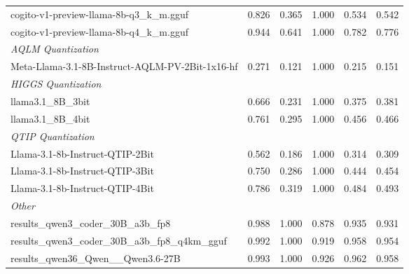 \begin{table}[htbp]
{\begin{tabular}{lrrrrr}
    cogito-v1-preview-llama-8b-q3\_k\_m.gguf & 0.826 & 0.365 & 1.000 & 0.534 & 0.542 \\
    cogito-v1-preview-llama-8b-q4\_k\_m.gguf & 0.944 & 0.641 & 1.000 & 0.782 & 0.776 \\
    \midrule
    \multicolumn{6}{l}{\textit{AQLM Quantization}} \\
    \midrule
    Meta-Llama-3.1-8B-Instruct-AQLM-PV-2Bit-1x16-hf & 0.271 & 0.121 & 1.000 & 0.215 & 0.151 \\
    \midrule
    \multicolumn{6}{l}{\textit{HIGGS Quantization}} \\
    \midrule
    llama3.1\_8B\_3bit & 0.666 & 0.231 & 1.000 & 0.375 & 0.381 \\
    llama3.1\_8B\_4bit & 0.761 & 0.295 & 1.000 & 0.456 & 0.466 \\
    \midrule
    \multicolumn{6}{l}{\textit{QTIP Quantization}} \\
    \midrule
    Llama-3.1-8b-Instruct-QTIP-2Bit & 0.562 & 0.186 & 1.000 & 0.314 & 0.309 \\
    Llama-3.1-8b-Instruct-QTIP-3Bit & 0.750 & 0.286 & 1.000 & 0.444 & 0.454 \\
    Llama-3.1-8b-Instruct-QTIP-4Bit & 0.786 & 0.319 & 1.000 & 0.484 & 0.493 \\
    \midrule
    \multicolumn{6}{l}{\textit{Other}} \\
    \midrule
    results\_qwen3\_coder\_30B\_a3b\_fp8 & 0.988 & 1.000 & 0.878 & 0.935 & 0.931 \\
    results\_qwen3\_coder\_30B\_a3b\_fp8\_q4km\_gguf & 0.992 & 1.000 & 0.919 & 0.958 & 0.954 \\
    results\_qwen36\_Qwen\_\_Qwen3.6-27B & 0.993 & 1.000 & 0.926 & 0.962 & 0.958 \\
    \bottomrule
  \end{tabular}
  }
\end{table}

